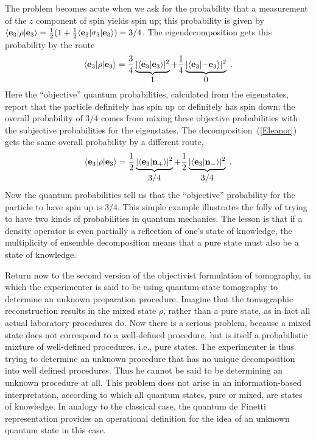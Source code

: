 The problem becomes acute when we ask for the probability that a
measurement of the $z$ component of spin yields spin up; this
probability is given by $\langle\vec e_3|\rho|\vec
e_3\rangle={1\over2}(1+{1\over2}\langle\vec e_3|\sigma_3|\vec
e_3\rangle)=3/4$.  The eigendecomposition gets this probability by
the route
\begin{equation}
\langle\vec e_3|\rho|\vec e_3\rangle=
{3\over4}
\underbrace{|\langle\vec e_3|\vec e_3\rangle|^2}_%
{\displaystyle{1}}
+{1\over4}
\underbrace{|\langle\vec e_3|\mathord{-}\vec e_3\rangle|^2}_%
{\displaystyle{0}}\;.
\end{equation}
Here the ``objective'' quantum probabilities, calculated from the
eigenstates, report that the particle definitely has spin up or
definitely has spin down; the overall probability of $3/4$ comes
from mixing these objective probabilities with the subjective
probabilities for the eigenstates.  The
decomposition~(\ref{Eleanor}) gets the same overall probability by
a different route,
\begin{equation}
\langle\vec e_3|\rho|\vec e_3\rangle=
{1\over2}
\underbrace{|\langle\vec e_3|\vec n_+\rangle|^2}_%
{\displaystyle{3/4}}
+{1\over2}
\underbrace{|\langle\vec e_3|\vec n_-\rangle|^2}_%
{\displaystyle{3/4}}
\;.
\end{equation}
Now the quantum probabilities tell us that the ``objective''
probability for the particle to have spin up is $3/4$.  This
simple example illustrates the folly of trying to have two kinds
of probabilities in quantum mechanics.  The lesson is that if a
density operator is even partially a reflection of one's state of
knowledge, the multiplicity of ensemble decomposition means that a
pure state must also be a state of knowledge.

Return now to the second version of the objectivist formulation of
tomography, in which the experimenter is said to be using
quantum-state tomography to determine an unknown preparation
procedure. Imagine that the tomographic reconstruction results in
the mixed state $\rho$, rather than a pure state, as in fact all
actual laboratory procedures do.   Now there is a serious problem,
because a mixed state does not correspond to a well-defined
procedure, but is itself a probabilistic mixture of well-defined
procedures, i.e., pure states.  The experimenter is thus trying to
determine an unknown procedure that has no unique decomposition
into well defined procedures.  Thus he cannot be said to be
determining an unknown procedure at all.  This problem does not
arise in an information-based interpretation, according to which
all quantum states, pure or mixed, are states of knowledge.  In
analogy to the classical case, the quantum de Finetti
representation provides an operational definition for the idea of
an unknown quantum state in this case.

